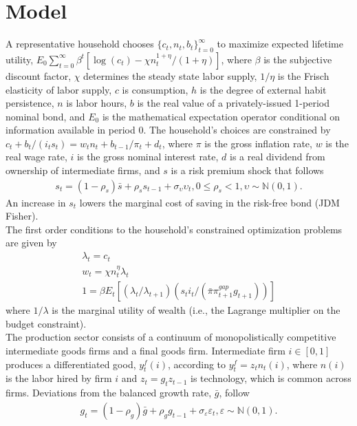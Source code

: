 \documentclass[12pt, final]{article}
\begin{document}
\section{Model} A representative household chooses $\{c_t, n_t, b_t\}_{t=0}^\infty$ to maximize expected lifetime utility, $E_0\textstyle\sum_{t=0}^\infty\beta^t [\log(c_t)-\chi n_t^{1+\eta}/(1+\eta)]$, where $\beta$ is the subjective discount factor, $\chi$ determines the steady state labor supply, $1/\eta$ is the Frisch elasticity of labor supply, $c$ is consumption, $h$ is the degree of external habit persistence, $n$ is labor hours, $b$ is the real value of a privately-issued 1-period nominal bond, and $E_0$ is the mathematical expectation operator conditional on information available in period 0. The household's choices are constrained by $c_t+b_t/(i_ts_t)=w_tn_t+b_{t-1}/\pi_t+d_t$, where $\pi$ is the gross inflation rate, $w$ is the real wage rate, $i$ is the gross nominal interest rate, $d$ is a real dividend from ownership of intermediate firms, and $s$ is a risk premium shock that follows
\begin{gather}
  s_t=(1-\rho_s)\bar{s}+\rho_s s_{t-1} + \sigma_\upsilon\upsilon_t, 0\leq \rho_s < 1, \upsilon \sim \mathbb{N}(0,1).
\end{gather}
An increase in $s_t$ lowers the marginal cost of saving in the risk-free bond (JDM Fisher).  \\
The first order conditions to the household's constrained optimization problems are given by
\begin{gather*}
  \lambda_t = c_t\\
  w_t = \chi n_t^\eta \lambda_t\\
  1 =  \beta E_t[(\lambda_t/\lambda_{t+1})(s_ti_t/(\bar{\pi}\pi_{t+1}^{gap}g_{t+1}))]
  \end{gather*}
where $1/\lambda$ is the marginal utility of wealth (i.e., the Lagrange multiplier on the budget constraint).\\
The production sector consists of a continuum of monopolistically competitive intermediate goods firms and a final goods firm. Intermediate firm $i \in [0,1]$ produces a differentiated good, $y_t^f(i)$, according to $y_t^f = z_tn_t(i)$, where $n(i)$ is the labor hired by firm $i$ and $z_t = g_tz_{t-1}$ is technology, which is common across firms. Deviations from the balanced growth rate, $\bar{g}$, follow
\begin{gather}
  g_t= (1-\rho_g)\bar{g}+\rho_gg_{t-1} + \sigma_\varepsilon\varepsilon_t, \varepsilon \sim \mathbb{N}(0,1).
\end{gather}
\end{document}
